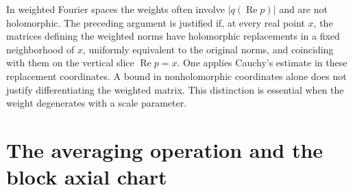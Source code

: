 In weighted Fourier spaces the weights often involve
$|q(\operatorname{Re}p)|$ and are not holomorphic. The preceding
argument is justified if, at every real point $x$, the matrices
defining the weighted norms have holomorphic replacements in a
fixed neighborhood of $x$, uniformly equivalent to the original
norms, and coinciding with them on the vertical slice
$\operatorname{Re}p=x$. One applies Cauchy's estimate in these
replacement coordinates. A bound in nonholomorphic coordinates
alone does not justify differentiating the weighted matrix.
This distinction is essential when the weight degenerates with a
scale parameter.

\section{The averaging operation and the block axial chart}
\label{ch05:actual-coordinates}

